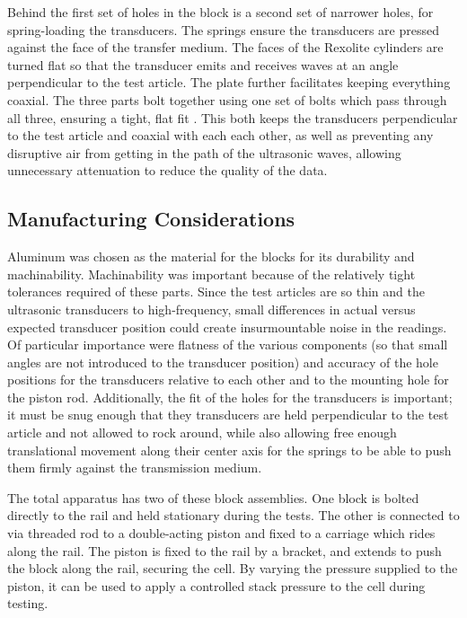 Behind the first set of holes in the block is a second set of narrower holes, for spring-loading the transducers. The springs ensure the transducers are pressed against the face of the transfer medium. The faces of the Rexolite cylinders are turned flat so that the transducer emits and receives waves at an angle perpendicular to the test article.  The plate further facilitates keeping everything coaxial. The three parts bolt together using one set of bolts which pass through all three, ensuring a tight, flat fit . This both keeps the transducers perpendicular to the test article and coaxial with each each other, as well as preventing any disruptive air from getting in the path of the ultrasonic waves, allowing unnecessary attenuation to reduce the quality of the data. 

\subsection{Manufacturing Considerations}
Aluminum was chosen as the material for the blocks for its durability and machinability. Machinability was important because of the relatively tight tolerances required of these parts. Since the test articles are so thin and the ultrasonic transducers to high-frequency, small differences in actual versus expected transducer position could create insurmountable noise in the readings. Of particular importance were flatness of the various components (so that small angles are not introduced to the transducer position) and accuracy of the hole positions for the transducers relative to each other and to the mounting hole for the piston rod. Additionally, the fit of the holes for the transducers is important; it must be snug enough that they transducers are held perpendicular to the test article and not allowed to rock around, while also allowing free enough translational movement along their center axis for the springs to be able to push them firmly against the transmission medium.

The total apparatus has two of these block assemblies. One block is bolted directly to the rail and held stationary during the tests. The other is connected to via threaded rod to a double-acting piston and fixed to a carriage which rides along the rail. The piston is fixed to the rail by a bracket, and extends to push the block along the rail, securing the cell. By varying the pressure supplied to the piston, it can be used to apply a controlled stack pressure to the cell during testing.


